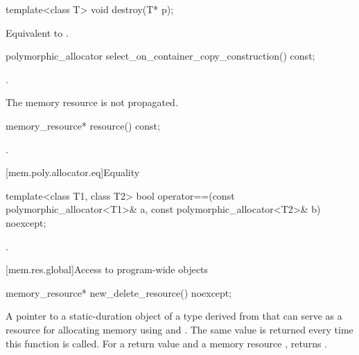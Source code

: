%
\begin{itemdecl}
template<class T>
  void destroy(T* p);
\end{itemdecl}

\begin{itemdescr}
\pnum
\effects
Equivalent to .
\end{itemdescr}

%
\begin{itemdecl}
polymorphic_allocator select_on_container_copy_construction() const;
\end{itemdecl}

\begin{itemdescr}
\pnum
\returns
{}.

\pnum
\begin{note}
The memory resource is not propagated.
\end{note}
\end{itemdescr}

%
\begin{itemdecl}
memory_resource* resource() const;
\end{itemdecl}

\begin{itemdescr}
\pnum
\returns
{}.
\end{itemdescr}

[mem.poly.allocator.eq]{Equality}

%
\begin{itemdecl}
template<class T1, class T2>
  bool operator==(const polymorphic_allocator<T1>& a,
                  const polymorphic_allocator<T2>& b) noexcept;
\end{itemdecl}

\begin{itemdescr}
\pnum
\returns
{}.
\end{itemdescr}

[mem.res.global]{Access to program-wide  objects}

%
\begin{itemdecl}
memory_resource* new_delete_resource() noexcept;
\end{itemdecl}

\begin{itemdescr}
\pnum
\returns
A pointer to a static-duration object of a type derived from 
that can serve as a resource for allocating memory
using  and .
The same value is returned every time this function is called.
For a return value  and a memory resource ,
 returns .
\end{itemdescr}

